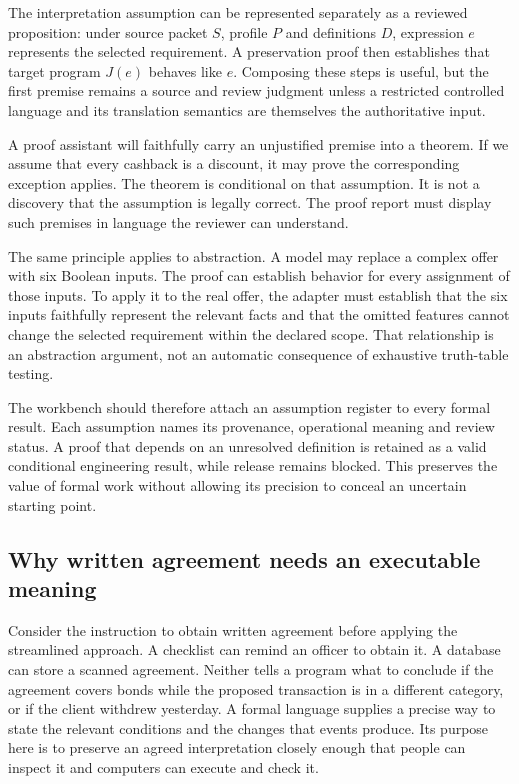 The interpretation assumption can be represented separately as a reviewed
proposition: under source packet $S$, profile $P$ and definitions $D$, expression
$e$ represents the selected requirement. A preservation proof then establishes
that target program $J(e)$ behaves like $e$. Composing these steps is useful, but
the first premise remains a source and review judgment unless a restricted
controlled language and its translation semantics are themselves the authoritative
input.


A proof assistant will faithfully carry an unjustified premise into a theorem.
If we assume that every cashback is a discount, it may prove the corresponding
exception applies. The theorem is conditional on that assumption. It is not a
discovery that the assumption is legally correct. The proof report must display
such premises in language the reviewer can understand.

The same principle applies to abstraction. A model may replace a complex offer
with six Boolean inputs. The proof can establish behavior for every assignment
of those inputs. To apply it to the real offer, the adapter must establish that
the six inputs faithfully represent the relevant facts and that the omitted
features cannot change the selected requirement within the declared scope.
That relationship is an abstraction argument, not an automatic consequence of
exhaustive truth-table testing.

The workbench should therefore attach an assumption register to every formal
result. Each assumption names its provenance, operational meaning and review
status. A proof that depends on an unresolved definition is retained as a valid
conditional engineering result, while release remains blocked. This preserves
the value of formal work without allowing its precision to conceal an uncertain
starting point.

\subsection{Why written agreement needs an executable meaning}
\label{merge:P-01a-language-lesson:00}

\label{sec:language-lesson}

Consider the instruction to obtain written agreement before applying the
streamlined approach. A checklist can remind an officer to obtain it. A database
can store a scanned agreement. Neither tells a program what to conclude if the
agreement covers bonds while the proposed transaction is in a different category,
or if the client withdrew yesterday. A formal language supplies a precise way
to state the relevant conditions and the changes that events produce. Its
purpose here is to preserve an agreed interpretation closely enough that people
can inspect it and computers can execute and check it.

